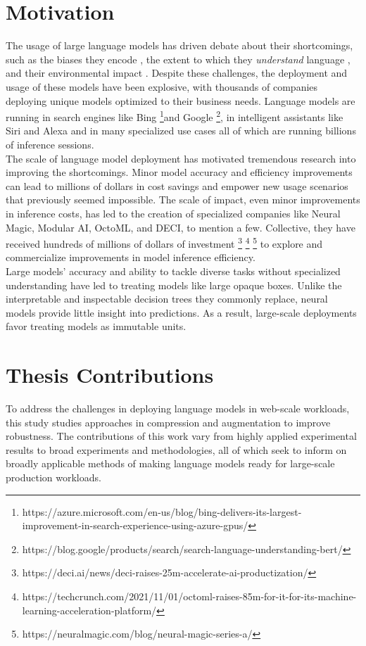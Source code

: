 \section{Motivation}
The usage of large language models has driven debate about their shortcomings, such as the biases they encode \cite{Nadeem2021StereoSetMS} \cite{Bender2021OnTD}, the extent to which they \textit{understand} language \cite{Petroni2019LanguageMA} \cite{Jiang2020HowCW}, and their environmental impact \cite{Strubell2020EnergyAP} \cite{Strubell2019EnergyAP}. Despite these challenges, the deployment and usage of these models have been explosive, with thousands of companies deploying unique models optimized to their business needs. Language models are running in search engines like Bing \footnote{https://azure.microsoft.com/en-us/blog/bing-delivers-its-largest-improvement-in-search-experience-using-azure-gpus/}and Google \footnote{https://blog.google/products/search/search-language-understanding-bert/}, in intelligent assistants like Siri and Alexa \cite{FitzGerald2022AlexaTM} and in many specialized use cases all of which are running billions of inference sessions. \\
The scale of language model deployment has motivated tremendous research into improving the shortcomings. Minor model accuracy and efficiency improvements can lead to millions of dollars in cost savings and empower new usage scenarios that previously seemed impossible. The scale of impact, even minor improvements in inference costs, has led to the creation of specialized companies like Neural Magic, Modular AI, OctoML, and DECI, to mention a few. Collective, they have received hundreds of millions of dollars of investment \footnote{https://deci.ai/news/deci-raises-25m-accelerate-ai-productization/} \footnote{https://techcrunch.com/2021/11/01/octoml-raises-85m-for-it-for-its-machine-learning-acceleration-platform/} \footnote{https://neuralmagic.com/blog/neural-magic-series-a/} to explore and commercialize improvements in model inference efficiency. \\ 
Large models' accuracy and ability to tackle diverse tasks without specialized understanding have led to treating models like large opaque boxes. Unlike the interpretable and inspectable decision trees they commonly replace, neural models provide little insight into predictions. As a result, large-scale deployments favor treating models as immutable units. 
\section{Thesis Contributions}
To address the challenges in deploying language models in web-scale workloads, this study studies approaches in compression and augmentation to improve robustness. The contributions of this work vary from highly applied experimental results to broad experiments and methodologies, all of which seek to inform on broadly applicable methods of making language models ready for large-scale production workloads. 
